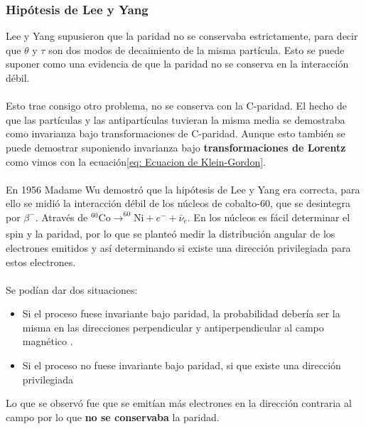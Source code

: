 \subsubsection{Hipótesis de Lee y Yang}

Lee y Yang supusieron que la paridad no se conservaba estrictamente, para decir que $\theta$ y $\tau$ son dos modos de decaimiento de la misma partícula. Esto se puede suponer como una evidencia de que la paridad no se conserva en la interacción débil.
\\\\
Esto trae consigo otro problema, no se conserva con la C-paridad. El hecho de que las partículas y las antipartículas tuvieran la misma media se demostraba como invarianza bajo transformaciones de C-paridad. Aunque esto también se puede demostrar suponiendo invarianza bajo \textbf{transformaciones de Lorentz} como vimos con la ecuación\ref{eq: Ecuacion de Klein-Gordon}.\\\\
En 1956 Madame Wu demostró que la hipótesis de Lee y Yang era correcta, para ello se midió la interacción débil de los núcleos de cobalto-60, que se desintegra por $\beta^-$. Através de $^{60}\mathrm{Co}\xrightarrow[]{}^{60}\mathrm{Ni}+e^-+\bar{\nu}_e$. En los núcleos es fácil determinar el spin y la paridad, por lo que se planteó medir la distribución angular de los electrones emitidos y así determinando si existe una dirección privilegiada para estos electrones.\\\\
Se podían dar dos situaciones:
\begin{itemize}
    \item Si el proceso fuese invariante bajo paridad, la probabilidad debería ser la misma en las direcciones perpendicular y antiperpendicular al campo magnético \footnotemark. 
    \item Si el proceso no fuese invariante bajo paridad, si que existe una dirección privilegiada
\end{itemize}

Lo que se observó fue que se emitían más electrones en la dirección contraria al campo por lo que \textbf{no se conservaba} la paridad.